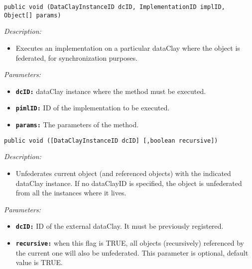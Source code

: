 
\begin{dBox}
\texttt{public void (DataClayInstanceID dcID, \newline ImplementationID implID, Object[] params)} 
\LINE

{\it Description:}

\begin{itemize}
  \item Executes an implementation on a particular dataClay where the object is federated, for synchronization purposes.
\end{itemize}

{\it Parameters:}

\begin{itemize}
  \item \texttt{\bfseries dcID:} dataClay instance where the method must be executed.
  \item \texttt{\bfseries pimlID:} ID of the implementation to be executed.
  \item \texttt{\bfseries params:} The parameters of the method.
\end{itemize}
 
\end{dBox}

\begin{dBox}

\texttt{public void ([DataClayInstanceID dcID] [,boolean recursive])}
\LINE

{\it Description:}

\begin{itemize}
  \item Unfederates current object (and referenced objects) with the indicated dataClay instance. If no dataClayID is specified, the object is unfederated from all the instances where it lives.
\end{itemize}

{\it Parameters:}

\begin{itemize}
  \item \texttt{\bfseries dcID:} ID of the external dataClay. It must be previously registered.
  \item \texttt{\bfseries recursive:} when this flag is TRUE, all objects (recursively) referenced by the current one will also be unfederated. This parameter is optional, default value is TRUE.
\end{itemize}

\end{dBox}

